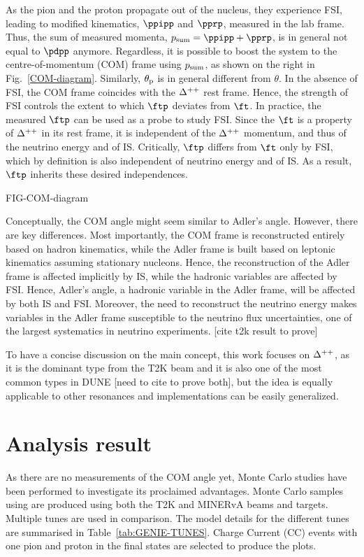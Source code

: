 As the pion and the proton propagate out of the nucleus, they experience FSI, leading to modified kinematics, $\ppipp$ and $\pprp$, measured in the lab frame. Thus, the sum of measured momenta, $\psum = \ppipp + \pprp$, is in general not equal to $\pdpp$ anymore. Regardless, it is possible to boost the system to the centre-of-momentum (COM) frame using $p_{\textrm{sum}}$, as shown on the right in Fig.~\ref{COM-diagram}. Similarly, $\theta_\textrm{p}$ is in general different from $\theta$. In the absence of FSI, the COM frame coincides with the $\Delta^{++}$ rest frame. Hence, the strength of FSI controls the extent to which $\ftp$ deviates from $\ft$. In practice, the measured $\ftp$ can be used as a probe to study FSI. Since the $\ft$ is a property of $\Delta^{++}$ in its rest frame, it is independent of the $\Delta^{++}$ momentum, and thus of the neutrino energy and of IS. Critically, $\ftp$ differs from $\ft$ only by FSI, which by definition is also independent of neutrino energy and of IS. As a result, $\ftp$ inherits these desired independences. 

FIG-COM-diagram

Conceptually, the COM angle might seem similar to Adler’s angle. However, there are key differences. Most importantly, the COM frame is reconstructed entirely based on hadron kinematics, while the Adler frame is built based on leptonic kinematics assuming stationary nucleons. Hence, the reconstruction of the Adler frame is affected implicitly by IS, while the hadronic variables are affected by FSI. Hence, Adler’s angle, a hadronic variable in the Adler frame, will be affected by both IS and FSI. Moreover, the need to reconstruct the neutrino energy makes variables in the Adler frame susceptible to the neutrino flux uncertainties, one of the largest systematics in neutrino experiments. [cite t2k result to prove]

To have a concise discussion on the main concept, this work focuses on $\Delta^{++}$, as it is the dominant type from the T2K beam and it is also one of the most common types in DUNE [need to cite to prove both], but the idea is equally applicable to other resonances and implementations can be easily generalized. 

\section{Analysis result}
As there are no measurements of the COM angle yet, Monte Carlo studies have been performed to investigate its proclaimed advantages. Monte Carlo samples using \genie are produced using both the T2K and MINERvA beams and targets. Multiple \genie tunes are used in comparison. The model details for the different tunes are summarised in Table~\ref{tab:GENIE-TUNES}. Charge Current (CC) events with one pion and proton in the final states are selected to produce the plots.

